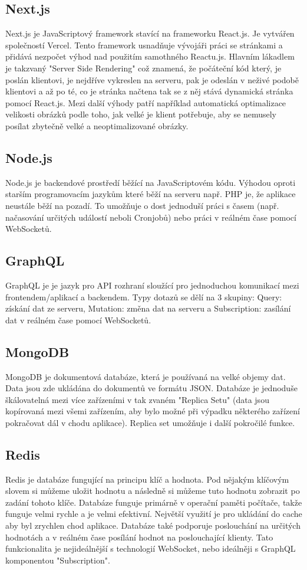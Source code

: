 \subsection{Next.js}
Next.js je JavaScriptový framework stavící na frameworku React.js. Je vytvářen společností Vercel. Tento framework usnadňuje vývojáři práci se stránkami a přidává nezpočet výhod nad použitím samothného Reactu.js. Hlavním lákadlem je takzvaný "Server Side Rendering" což znamená, že počáteční kód který, je poslán klientovi, je nejdříve vykreslen na serveru, pak je odeslán v neživé podobě klientovi a až po té, co je stránka načtena tak se z něj stává dynamická stránka pomocí React.js. Mezi další výhody patří například automatická optimalizace velikosti obrázků podle toho, jak velké je klient potřebuje, aby se nemusely posílat zbytečně velké a neoptimalizované obrázky.

\subsection{Node.js}
Node.js je backendové prostředí běžící na JavaScriptovém kódu. Výhodou oproti starším programovacím jazykům které běží na serveru např. PHP je, že aplikace neustále běží na pozadí. To umožňuje o dost jednoduší práci s časem (např. načasování určitých událostí neboli Cronjobů) nebo práci v reálném čase pomocí WebSocketů.

\subsection{GraphQL}
GraphQL je je jazyk pro API rozhraní sloužící pro jednoduchou komunikací mezi frontendem/aplikací a backendem. Typy dotazů se dělí na 3 skupiny: Query: získání dat ze serveru, Mutation: změna dat na serveru a Subscription: zasílání dat v reálném čase pomocí WebSocketů.

\subsection{MongoDB}
MongoDB je dokumentová databáze, která je používaná na velké objemy dat. Data jsou zde ukládána do dokumentů ve formátu JSON. Databáze je jednoduše škálovatelná mezi více zařízeními v tak zvaném "Replica Setu" (data jsou kopírovaná mezi všemi zařízením, aby bylo možné při výpadku některého zařízení pokračovat dál v chodu aplikace). Replica set umožňuje i další pokročilé funkce.

\subsection{Redis}
Redis je databáze fungující na principu klíč a hodnota. Pod nějakým klíčovým slovem si můžeme uložit hodnotu a následně si můžeme tuto hodnotu zobrazit po zadání tohoto klíče. Databáze funguje primárně v operační paměti počítače, takže funguje velmi rychle a je velmi efektivní. Největší využití je pro ukládání do cache aby byl zrychlen chod aplikace. Databáze také podporuje poslouchání na určitých hodnotách a v reálném čase posílání hodnot na poslouchající klienty. Tato funkcionalita je nejideálnější s technologií WebSocket, nebo ideálněji s GraphQL komponentou "Subscription".

